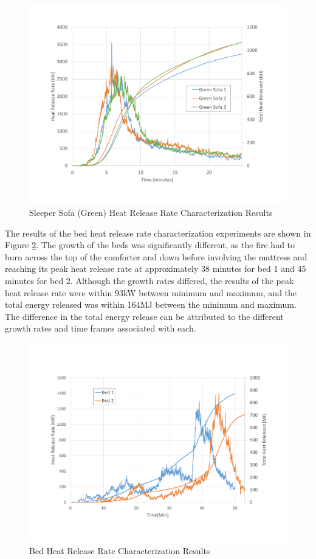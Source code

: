 \documentclass{article}
\begin{document}
\begin{figure}[H]
	\centering
	\includegraphics[width=\textwidth]{0_Images/Furniture/Sofa_Green_HRR.pdf}
	\caption{Sleeper Sofa (Green) Heat Release Rate Characterization Results}
	\label{fig:SofaGreenHRR}
\end{figure}

\clearpage

The results of the bed heat release rate characterization experiments are shown in Figure \ref{fig:BedHRR}. The growth of the beds was significantly different, as the fire had to burn across the top of the comforter and down before involving the mattress and reaching its peak heat release rate at approximately 38 minutes for bed 1 and 45 minutes for bed 2. Although the growth rates differed, the results of the peak heat release rate were within 93kW between minimum and maximum, and the total energy released was within 164MJ between the minimum and maximum. The difference in the total energy release can be attributed to the different growth rates and time frames associated with each.

\begin{figure}[H]
	\centering
	\includegraphics[width=\textwidth]{0_Images/Furniture/Bed_HRR.pdf}
	\caption{Bed Heat Release Rate Characterization Results}
	\label{fig:BedHRR}
\end{figure}
\end{document}

